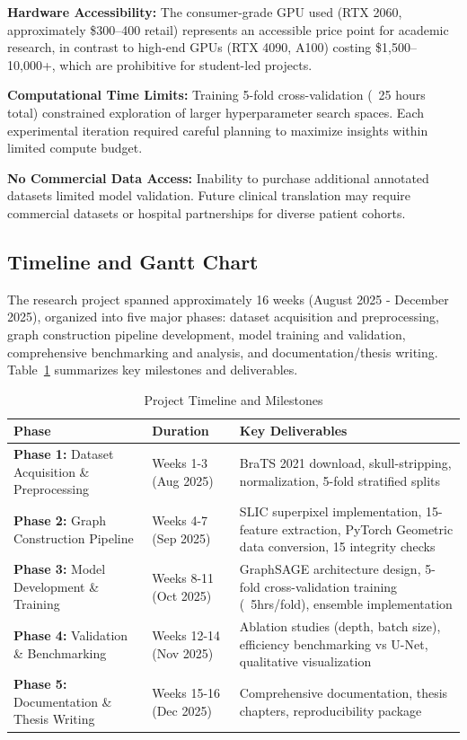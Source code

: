 \textbf{Hardware Accessibility:} The consumer-grade GPU used (RTX 2060, approximately \$300--400 retail) represents an accessible price point for academic research, in contrast to high-end GPUs (RTX 4090, A100) costing \$1,500--10,000+, which are prohibitive for student-led projects.

\textbf{Computational Time Limits:} Training 5-fold cross-validation (~25 hours total) constrained exploration of larger hyperparameter search spaces. Each experimental iteration required careful planning to maximize insights within limited compute budget.

\textbf{No Commercial Data Access:} Inability to purchase additional annotated datasets limited model validation. Future clinical translation may require commercial datasets or hospital partnerships for diverse patient cohorts.


\subsection{Timeline and Gantt Chart}

The research project spanned approximately 16 weeks (August 2025 - December 2025), organized into five major phases: dataset acquisition and preprocessing, graph construction pipeline development, model training and validation, comprehensive benchmarking and analysis, and documentation/thesis writing. Table~\ref{tab:timeline} summarizes key milestones and deliverables.

\begin{table}[htbp]
\caption{Project Timeline and Milestones}
\label{tab:timeline}
\begin{center}
\begin{tabularx}{\textwidth} { 
  | >{\raggedright\arraybackslash}X 
  | >{\centering\arraybackslash}X 
  | >{\raggedright\arraybackslash}X 
  | }
\hline
\textbf{Phase} & \textbf{Duration} & \textbf{Key Deliverables}\\
\hline
\textbf{Phase 1:} Dataset Acquisition \& Preprocessing & Weeks 1-3 (Aug 2025) & BraTS 2021 download, skull-stripping, normalization, 5-fold stratified splits\\
\hline
\textbf{Phase 2:} Graph Construction Pipeline & Weeks 4-7 (Sep 2025) & SLIC superpixel implementation, 15-feature extraction, PyTorch Geometric data conversion, 15 integrity checks\\
\hline
\textbf{Phase 3:} Model Development \& Training & Weeks 8-11 (Oct 2025) & GraphSAGE architecture design, 5-fold cross-validation training (~5hrs/fold), ensemble implementation\\
\hline
\textbf{Phase 4:} Validation \& Benchmarking & Weeks 12-14 (Nov 2025) & Ablation studies (depth, batch size), efficiency benchmarking vs U-Net, qualitative visualization\\
\hline
\textbf{Phase 5:} Documentation \& Thesis Writing & Weeks 15-16 (Dec 2025) & Comprehensive documentation, thesis chapters, reproducibility package\\
\hline
\end{tabularx}
\end{center}
\end{table}

